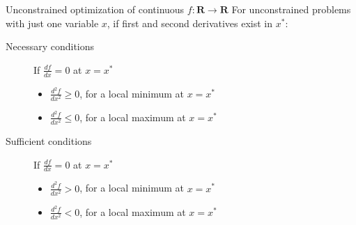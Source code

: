 \documentclass[c]{beamer}
\begin{document}
\begin{frame}{Unconstrained optimization of continuous $f:\mathbf{R}\rightarrow\mathbf{R}$}
  For unconstrained problems with just one variable $x$, if first and second derivatives exist in $x^*$:
  \begin{description}
    \item[Necessary conditions] If $\frac{df}{dx}=0$ at $x=x^*$
    \begin{itemize}
      \item $\frac{d^2f}{dx^2}\geq 0$, for a local minimum at $x=x^*$
      \item $\frac{d^2f}{dx^2}\leq 0$, for a local maximum at $x=x^*$
    \end{itemize}
    \item[Sufficient conditions] If $\frac{df}{dx}=0$ at $x=x^*$
    \begin{itemize}
      \item $\frac{d^2f}{dx^2}> 0$, for a local minimum at $x=x^*$
      \item $\frac{d^2f}{dx^2}< 0$, for a local maximum at $x=x^*$
    \end{itemize}
  \end{description}
\end{frame}
\end{document}
